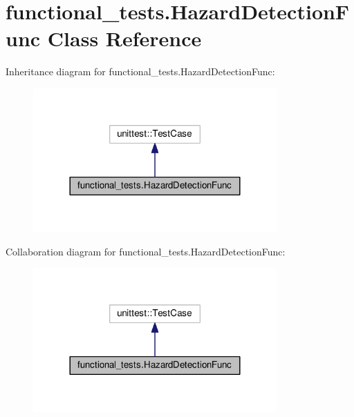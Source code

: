 \hypertarget{classfunctional__tests_1_1HazardDetectionFunc}{\section{functional\-\_\-tests.\-Hazard\-Detection\-Func Class Reference}
\label{classfunctional__tests_1_1HazardDetectionFunc}
}


Inheritance diagram for functional\-\_\-tests.\-Hazard\-Detection\-Func\-:
\nopagebreak
\begin{figure}[H]
\begin{center}
\leavevmode
\includegraphics[width=264pt]{classfunctional__tests_1_1HazardDetectionFunc__inherit__graph}
\end{center}
\end{figure}


Collaboration diagram for functional\-\_\-tests.\-Hazard\-Detection\-Func\-:
\nopagebreak
\begin{figure}[H]
\begin{center}
\leavevmode
\includegraphics[width=264pt]{classfunctional__tests_1_1HazardDetectionFunc__coll__graph}
\end{center}
\end{figure}
